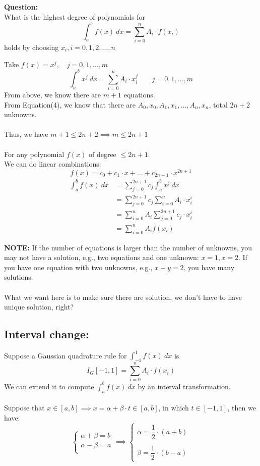 \documentclass [9 pt]{article}
\theoremstyle{definition}
\begin{document}
\newpage
\textbf{Question:}\\
What is the highest degree of polynomials for 
\begin{equation}
	\int_{a}^{b} f(x)\ dx = \sum_{i = 0}^n A_i \cdot f(x_i)
\end{equation} 
holds by choosing $x_i, i = 0, 1, 2, \ldots , n$
\begin{mdframed}
	Take $f(x) = x^j,\quad j = 0, 1, \ldots , m$\\
	$$\int_{a}^{b} x^j \ dx = \sum_{i = 0}^{n} A_i \cdot x_i^j \quad\quad j = 0, 1, \ldots , m	$$
	From above, we know there are $m + 1$ equations.\\
	From Equation(4), we know that there are $A_0, x_0, A_1, x_1, \ldots , A_n, x_n$, total $2n + 2$ unknowns.\\
	\\
	Thus, we have $m+1 \leq 2n + 2 \implies m \leq 2n + 1$\\
	\\
	For any polynomial $f(x)$ of degree $\leq 2n+1$.\\
	We can do linear combinations:
	$$f(x) = c_0 + c_1\cdot x + \ldots + c_{2n+1}\cdot x^{2n+1}$$
	\begin{align*}
		\int_{a}^{b} f(x)\ dx 
		&= \sum_{j = 0}^{2n + 1}c_j \int_a^b x^j\ dx\\
		&= \sum_{j = 0}^{2n + 1}c_j \sum_{i = 0}^n A_i\cdot x_i^i\\
		&= \sum_{i = 0}^n A_i \sum_{j = 0}^{2n + 1}c_j \cdot x_i^i\\
		&= \sum_{i = 0}^n A_i f(x_i)
	\end{align*}
\end{mdframed}
\textbf{NOTE:}
If the number of equations is larger than the number of unknowns, you may not have a solution, e,g.,  two equations and one unknown: $x = 1, x =2$.  If you have one equation with two unknowns, e.g.,  $x +y =2$, you have many solutions.\\
\\
What we want here is to make sure there are solution, we don't have to have unique solution, right?

\newpage

\subsection*{Interval change:}
 Suppose a Gaussian quadrature rule for $\int^1_{-1} f(x)\ dx$ is
$$ I_G[-1, 1] = \sum_{i = 0}^{n} A_i\cdot f(x_i) $$
We can extend it to compute $\int_{a}^b f(x)\ dx$ by an interval transformation.\\
\\
Suppose that $x \in [a, b]\implies x = \alpha + \beta \cdot t \in [a, b]$, in which $t \in [-1, 1]$, then we have:
$$ \begin{cases}
	\alpha + \beta = b\\
	\alpha - \beta = a \\
\end{cases} \implies \begin{cases}
	\alpha = \dfrac{1}{2} \cdot ( a + b)\\
	\\
	\beta = \dfrac{1}{2} \cdot (b - a)
\end{cases} $$
\end{document}
